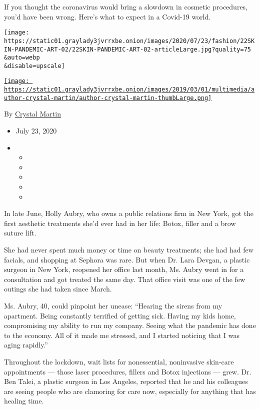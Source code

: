 If you thought the coronavirus would bring a slowdown in cosmetic
procedures, you'd have been wrong. Here's what to expect in a Covid-19
world.

\texttt{[image: https://static01.graylady3jvrrxbe.onion/images/2020/07/23/fashion/22SKIN-PANDEMIC-ART-02/22SKIN-PANDEMIC-ART-02-articleLarge.jpg?quality=75\\\&auto=webp\\\&disable=upscale]}

\href{https://www.nytimes3xbfgragh.onion/by/crystal-martin}{\texttt{[image: https://static01.graylady3jvrrxbe.onion/images/2019/03/01/multimedia/author-crystal-martin/author-crystal-martin-thumbLarge.png]}}

By \href{https://www.nytimes3xbfgragh.onion/by/crystal-martin}{Crystal
Martin}

\begin{itemize}
\item
  July 23, 2020
\item
  \begin{itemize}
  \item
  \item
  \item
  \item
  \item
  \end{itemize}
\end{itemize}

In late June, Holly Aubry, who owns a public relations firm in New York,
got the first aesthetic treatments she'd ever had in her life: Botox,
filler and a brow suture lift.

She had never spent much money or time on beauty treatments; she had had
few facials, and shopping at Sephora was rare. But when Dr. Lara Devgan,
a plastic surgeon in New York, reopened her office last month, Ms. Aubry
went in for a consultation and got treated the same day. That office
visit was one of the few outings she had taken since March.

Ms. Aubry, 40, could pinpoint her unease: ``Hearing the sirens from my
apartment. Being constantly terrified of getting sick. Having my kids
home, compromising my ability to run my company. Seeing what the
pandemic has done to the economy. All of it made me stressed, and I
started noticing that I was aging rapidly.''

Throughout the lockdown, wait lists for nonessential, noninvasive
skin-care appointments --- those laser procedures, fillers and Botox
injections --- grew. Dr. Ben Talei, a plastic surgeon in Los Angeles,
reported that he and his colleagues are seeing people who are clamoring
for care now, especially for anything that has healing time.

